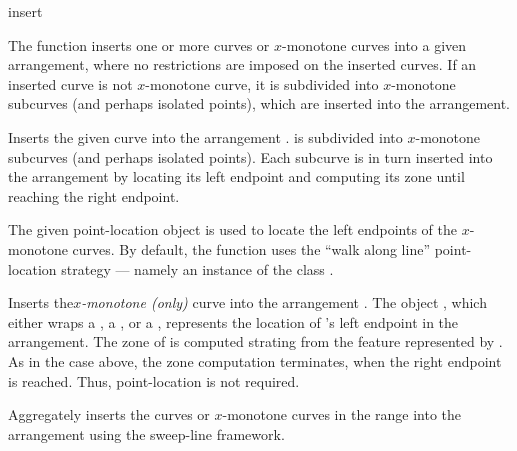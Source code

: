 \ccRefPageBegin

\begin{ccRefFunction}{insert}

\ccDefinition

The function \ccRefName{} inserts one or more curves or $x$-monotone curves
into a given arrangement, where no restrictions are imposed on the inserted
curves. If an inserted curve is not $x$-monotone curve, it is subdivided
into $x$-monotone subcurves (and perhaps isolated points), which are
inserted into the arrangement.



Inserts the given curve  into the arrangement .
 is subdivided into $x$-monotone subcurves (and perhaps isolated
points). Each subcurve is in turn inserted into the arrangement by locating
its left endpoint and computing its zone until reaching the right endpoint.

The given point-location object  is used to locate the left
endpoints of the $x$-monotone curves. By default, the function uses the
``walk along line'' point-location strategy --- namely an instance of
the class .


Inserts the{\em $x$-monotone (only)} curve  into the
arrangement . The object , which either
wraps a , a , or a
, represents the location of 's left
endpoint in the arrangement. The zone of  is computed strating
from the feature represented by . As in the case above, the
zone computation terminates, when the right endpoint is reached.
Thus, point-location is not required. 


Aggregately inserts the curves or $x$-monotone curves in the range
\ccc{[first,last)} into the arrangement  using the sweep-line
framework.


\end{ccRefFunction}
